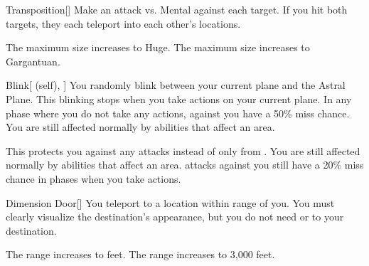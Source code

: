 \lowercase{\hypertarget{spell:Transposition}{}}\label{spell:Transposition}
\begin{freeability}[Rank 3]{\hypertarget{spell:Transposition}{Transposition}}[]
Make an attack vs. Mental against each target.
If you hit both targets, they each teleport into each other's locations.

\rankline
{} The maximum size increases to Huge.
 The maximum size increases to Gargantuan.
\end{freeability}
\vspace{0.25em}



\lowercase{\hypertarget{spell:Blink}{}}\label{spell:Blink}
\begin{attuneability}[Rank 4]{\hypertarget{spell:Blink}{Blink}}[ (self), ]
You randomly blink between your current plane and the Astral Plane.
This blinking stops when you take actions on your current plane.
In any phase where you do not take any actions,   against you have a 50\% miss chance.
You are still affected normally by abilities that affect an area.

\rankline
{} This protects you against any  attacks instead of only from .
You are still affected normally by abilities that affect an area.
  attacks against you still have a 20\% miss chance in phases when you take actions.
\end{attuneability}
\vspace{0.25em}



\lowercase{\hypertarget{spell:Dimension Door}{}}\label{spell:Dimension Door}
\begin{freeability}[Rank 4]{\hypertarget{spell:Dimension Door}{Dimension Door}}[]
You teleport to a location within \rnglong range of you.
You must clearly visualize the destination's appearance, but you do not need  or  to your destination.

\rankline
{} The range increases to \rngext feet.
 The range increases to 3,000 feet.
\end{freeability}
\vspace{0.25em}



